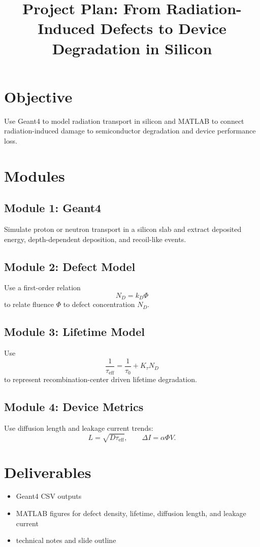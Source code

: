 \documentclass[11pt]{article}
\title{Project Plan: From Radiation-Induced Defects to Device Degradation in Silicon}
\begin{document}
\maketitle

\section*{Objective}
Use Geant4 to model radiation transport in silicon and MATLAB to connect radiation-induced damage to semiconductor degradation and device performance loss.

\section*{Modules}
\subsection*{Module 1: Geant4}
Simulate proton or neutron transport in a silicon slab and extract deposited energy, depth-dependent deposition, and recoil-like events.

\subsection*{Module 2: Defect Model}
Use a first-order relation
\[
N_D = k_D \Phi
\]
to relate fluence $\Phi$ to defect concentration $N_D$.

\subsection*{Module 3: Lifetime Model}
Use
\[
\frac{1}{\tau_{\mathrm{eff}}} = \frac{1}{\tau_0} + K_\tau N_D
\]
to represent recombination-center driven lifetime degradation.

\subsection*{Module 4: Device Metrics}
Use diffusion length and leakage current trends:
\[
L = \sqrt{D\tau_{\mathrm{eff}}}, \qquad \Delta I = \alpha \Phi V.
\]

\section*{Deliverables}
\begin{itemize}
    \item Geant4 CSV outputs
    \item MATLAB figures for defect density, lifetime, diffusion length, and leakage current
    \item technical notes and slide outline
\end{itemize}
\end{document}
